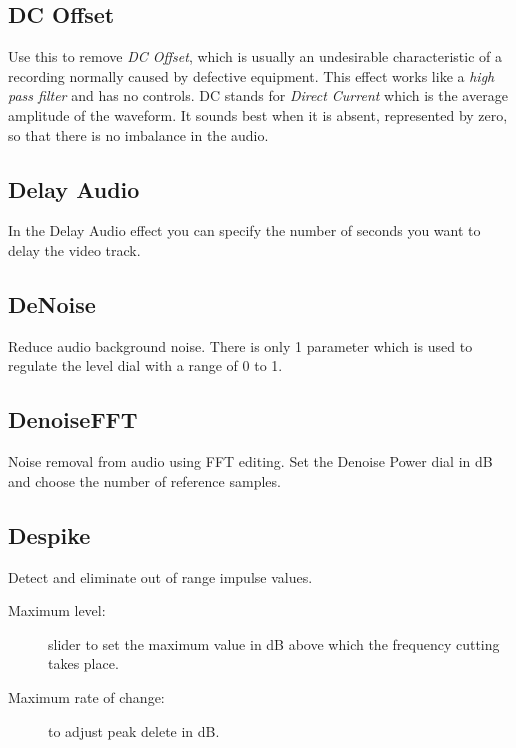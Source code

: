 \subsection{DC Offset}%
\label{sub:dc_offset}

Use this to remove \textit{DC Offset}, which is usually an undesirable characteristic of a recording normally caused by defective equipment. This effect works like a \textit{high pass filter} and has no controls. DC stands for \textit{Direct Current} which is the average amplitude of the waveform. It sounds best when it is absent, represented by zero, so that there is no imbalance in the audio.

\subsection{Delay Audio}%
\label{sub:delay_audio}

In the Delay Audio effect you can specify the number of seconds you want to delay the video track.

\subsection{DeNoise}%
\label{sub:denoise}

Reduce audio background noise. There is only 1 parameter which is used to regulate the level dial with a range of 0 to 1.

\subsection{DenoiseFFT}%
\label{sub:denoisefft}

Noise removal from audio using FFT editing. Set the Denoise Power dial in dB and choose the number of reference samples.

\subsection{Despike}%
\label{sub:despike}

Detect and eliminate out of range impulse values.

\begin{description}
    \item[Maximum level:] slider to set the maximum value in dB above which the frequency cutting takes place.
    \item[Maximum rate of change:] to adjust peak delete in dB.
\end{description}

